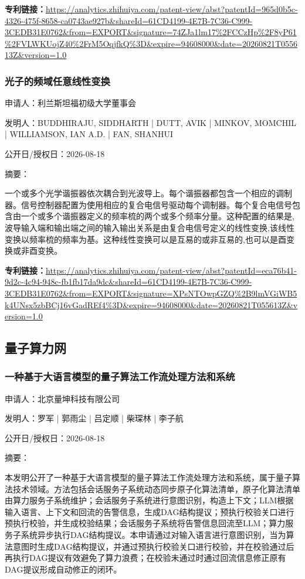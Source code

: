 \documentclass[12pt,a4paper]{ctexart}
\begin{document}
\noindent\textbf{专利链接：}\url{https://analytics.zhihuiya.com/patent-view/abst?patentId=965d0b5c-4326-475f-8658-ca0743ae927b&shareId=61CD4199-4E7B-7C36-C999-3CEDB31E0762&from=EXPORT&signature=74ZJa1lm17%2FCCzHp%2F8yP61%2FVLWKUojZ40%2FrM5OqjfkQ%3D&expire=94608000&date=20260821T055613Z&version=1.0}

\subsubsection{ 光子的频域任意线性变换 }

申请人：利兰斯坦福初级大学董事会

发明人：BUDDHIRAJU, SIDDHARTH | DUTT, AVIK | MINKOV, MOMCHIL | WILLIAMSON, IAN A.D. | FAN, SHANHUI

公开日/授权日：2026-08-18

摘要：

一个或多个光学谐振器依次耦合到光波导上。每个谐振器都包含一个相应的调制器。信号控制器配置为使用相应的复合电信号驱动每个调制器。每个复合电信号包含由一个或多个谐振器定义的频率梳的两个或多个频率分量。这种配置的结果是,波导输入端和输出端之间的输入输出关系是由复合电信号定义的线性变换,该线性变换以频率梳的频率为基。这种线性变换可以是互易的或非互易的,也可以是酉变换或非酉变换。

\noindent\textbf{专利链接：}\url{https://analytics.zhihuiya.com/patent-view/abst?patentId=eca76b41-9d2c-4c94-948c-fb1fb17da9dc&shareId=61CD4199-4E7B-7C36-C999-3CEDB31E0762&from=EXPORT&signature=XPsNTOwpGZQ%2B9lmVGiWB5k4UNsx5zbBCj16vGadREf4%3D&expire=94608000&date=20260821T055613Z&version=1.0}


\subsection{ 量子算力网 }

\subsubsection{ 一种基于大语言模型的量子算法工作流处理方法和系统 }

申请人：北京量坤科技有限公司

发明人：罗军 | 郭雨尘 | 吕定顺 | 柴琛林 | 李子航

公开日/授权日：2026-08-18

摘要：

本发明公开了一种基于大语言模型的量子算法工作流处理方法和系统，属于量子算法技术领域。方法包括会话服务子系统动态同步原子化算法清单，原子化算法清单由算力服务子系统维护；会话服务子系统进行意图识别，构造上下文；LLM根据输入语言、上下文和回流的告警信息，生成DAG结构提议；预执行校验关口进行预执行校验，并生成校验结果；会话服务子系统将告警信息回流至LLM；算力服务子系统异步执行DAG结构提议。本申请通过对输入语言进行意图识别，当为算法意图时生成DAG结构提议，并通过预执行校验关口进行校验，并在校验通过后再执行DAG提议有效避免了算力浪费；在校验未通过时通过回流信息修正原有DAG提议形成自动修正的闭环。
\end{document}
